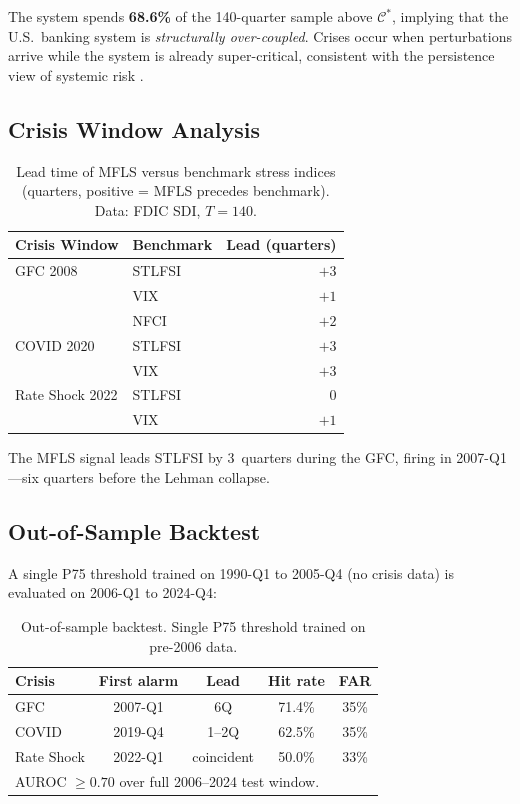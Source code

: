 \documentclass[final]{siamltex}
\newcommand{\Cman}{\mathcal{C}^*}
\begin{document}
The system spends \textbf{68.6\%} of the 140-quarter sample above
$\Cman$, implying that the U.S.\ banking system is \emph{structurally
over-coupled}. Crises occur when perturbations arrive while the
system is already super-critical, consistent with the persistence
view of systemic risk \cite{brunnermeier2009deciphering}.

\subsection{Crisis Window Analysis}

\begin{table}[htbp]
\centering
\caption{Lead time of MFLS versus benchmark stress indices
(quarters, positive = MFLS precedes benchmark). Data: FDIC SDI,
$T=140$.}
\label{tab:lead}
\begin{tabular}{llr}
\toprule
Crisis Window & Benchmark & Lead (quarters)\\
\midrule
GFC 2008    & STLFSI      & $+3$\\
            & VIX         & $+1$\\
            & NFCI        & $+2$\\
COVID 2020  & STLFSI      & $+3$\\
            & VIX         & $+3$\\
Rate Shock 2022 & STLFSI  & $0$\\
            & VIX         & $+1$\\
\bottomrule
\end{tabular}
\end{table}

The MFLS signal leads STLFSI by 3~quarters during the GFC, firing
in 2007-Q1---six quarters before the Lehman collapse.

\subsection{Out-of-Sample Backtest}

A single P75 threshold trained on 1990-Q1 to 2005-Q4 (no crisis
data) is evaluated on 2006-Q1 to 2024-Q4:

\begin{table}[htbp]
\centering
\caption{Out-of-sample backtest. Single P75 threshold trained on pre-2006
data.}
\label{tab:oos}
\begin{tabular}{lcccc}
\toprule
Crisis & First alarm & Lead & Hit rate & FAR\\
\midrule
GFC         & 2007-Q1 & 6Q & 71.4\% & 35\%\\
COVID       & 2019-Q4 & 1--2Q & 62.5\% & 35\%\\
Rate Shock  & 2022-Q1 & coincident & 50.0\% & 33\%\\
\midrule
\multicolumn{5}{l}{\small AUROC $\ge 0.70$ over full 2006--2024 test
window.}\\
\bottomrule
\end{tabular}
\end{table}
\end{document}
